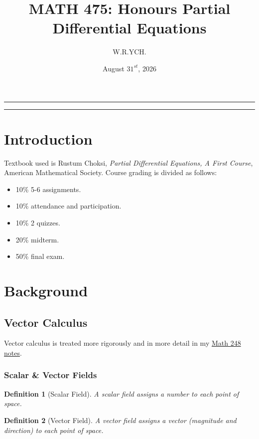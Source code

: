 \documentclass{article}
\newtheorem{definition}{Definition}
\begin{document}
\title{MATH 475: Honours Partial Differential Equations}
\author{W.R.YCH.}
\date{August \(31^{st}\), 2026}
\setcounter{Maxaffil}{0}
\renewcommand\Affilfont{\itshape\small}
\maketitle
\noindent\rule{\textwidth}{0.4pt}
\thispagestyle{empty}
\begin{abstract}
\end{abstract}
\noindent\rule{\textwidth}{0.4pt}
\clearpage
\pagestyle{empty}
{
  \hypersetup{linkcolor=black}
  \tableofcontents
}
\clearpage
\pagestyle{plain}
\setcounter{page}{1}


\section{Introduction}
Textbook used is Rustum Choksi, \emph{Partial Differential Equations, A First Course}, American Mathematical Society. Course grading is divided as follows:
\begin{itemize}
    \item 10\% 5-6 assignments.
    \item 10\% attendance and participation.
    \item 10\% 2 quizzes.
    \item 20\% midterm.
    \item 50\% final exam.
\end{itemize}


\section{Background}
\subsection{Vector Calculus}
Vector calculus is treated more rigorously and in more detail in my \href{https://github.com/williamr-yc7/stem-undergrad-notes/blob/011a574fff71c42c7f6da991d86a32781389d554/Fall%202025/Math248.pdf}{Math 248 notes}.

\subsubsection{Scalar \& Vector Fields}
\begin{definition}[Scalar Field]
    A scalar field assigns a number to each point of space.
\end{definition}
\begin{definition}[Vector Field]
    A vector field assigns a vector (magnitude and direction) to each point of space.
\end{definition}
\end{document}
